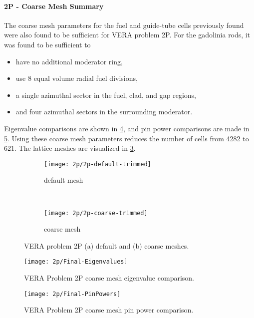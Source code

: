 {{{{        \paragraph{2P - Coarse Mesh Summary}{
          The coarse mesh parameters for the fuel and guide-tube cells previously found were also found to be sufficient for \ac{VERA} problem 2P.
          For the gadolinia rods, it was found to be sufficient to
          \begin{itemize}
            \item{have no additional moderator ring,}
            \item{use 8 equal volume radial fuel divisions,}
            \item{a single azimuthal sector in the fuel, clad, and gap regions,}
            \item{and four azimuthal sectors in the surrounding moderator.}
          \end{itemize}

          Eigenvalue comparisons are shown in \cref{fig:LSMOC:2P:Coarse Mesh:Eigenvalues}, and pin power comparisons are made in \cref{fig:LSMOC:2P:Coarse Mesh:PinPowers}.
          Using these coarse mesh parameters reduces the number of cells from 4282 to 621.
          The lattice meshes are visualized in \cref{figs:LSMOC:2p:Meshes}.

          \begin{figure}[h]
            \centering
            \begin{subfigure}[t]{0.45\textwidth}
                \centering
                \texttt{[image: 2p/2p-default-trimmed]}
                \caption{default mesh\label{fig:LSMOC:2p:Default Mesh}}
            \end{subfigure}%
            ~
            \begin{subfigure}[t]{0.45\textwidth}
                \centering
                \texttt{[image: 2p/2p-coarse-trimmed]}
                \caption{coarse mesh\label{fig:LSMOC:2p:Coarse Mesh}}
            \end{subfigure}
            \caption{VERA problem 2P (a) default and (b) coarse meshes.\label{figs:LSMOC:2p:Meshes}}
          \end{figure}

          \begin{figure}
            \centering
            \texttt{[image: 2p/Final-Eigenvalues]}
            \caption{VERA Problem 2P coarse mesh eigenvalue comparison. \label{fig:LSMOC:2P:Coarse Mesh:Eigenvalues}}
          \end{figure}
          \begin{figure}
            \centering
            \texttt{[image: 2p/Final-PinPowers]}
            \caption{VERA Problem 2P coarse mesh pin power comparison. \label{fig:LSMOC:2P:Coarse Mesh:PinPowers}}
          \end{figure}
        }
      }

}}}
